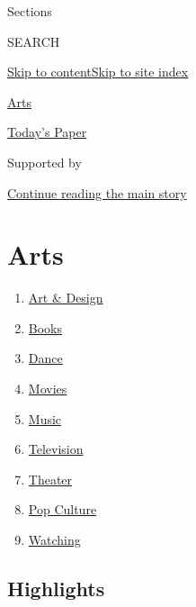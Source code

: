 Sections

SEARCH

\protect\hyperlink{site-content}{Skip to
content}\protect\hyperlink{site-index}{Skip to site index}

\href{https://www.nytimes.com/section/arts}{Arts}

\href{https://myaccount.nytimes.com/auth/login?response_type=cookie\&client_id=vi}{}

\href{https://www.nytimes.com/section/todayspaper}{Today's Paper}

Supported by

\protect\hyperlink{after-sponsor}{Continue reading the main story}

\hypertarget{arts}{%
\section{Arts}\label{arts}}

\begin{enumerate}
\def\labelenumi{\arabic{enumi}.}
\tightlist
\item
  \href{/section/arts/design}{Art \& Design}
\item
  \href{/section/books}{Books}
\item
  \href{/section/arts/dance}{Dance}
\item
  \href{/section/movies}{Movies}
\item
  \href{/section/arts/music}{Music}
\item
  \href{/section/arts/television}{Television}
\item
  \href{/section/theater}{Theater}
\item
  \href{/spotlight/pop-culture}{Pop Culture}
\item
  \href{/watching}{Watching}
\end{enumerate}

\hypertarget{highlights}{%
\subsection{Highlights}\label{highlights}}

